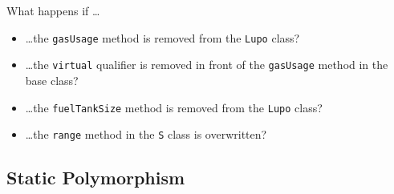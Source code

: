 \begin{exc}
What happens if \dots 
\begin{itemize}
\item \dots the \texttt{gasUsage} method is removed from the \texttt{Lupo} class?
\item \dots the \texttt{virtual} qualifier is removed in front of the
  \texttt{gasUsage} method in the base class?
\item \dots the \texttt{fuelTankSize} method is removed from the \texttt{Lupo} class?
\item \dots the \texttt{range} method in the \texttt{S} class is
  overwritten?
\end{itemize}
\end{exc}

\subsection*{Static Polymorphism}

